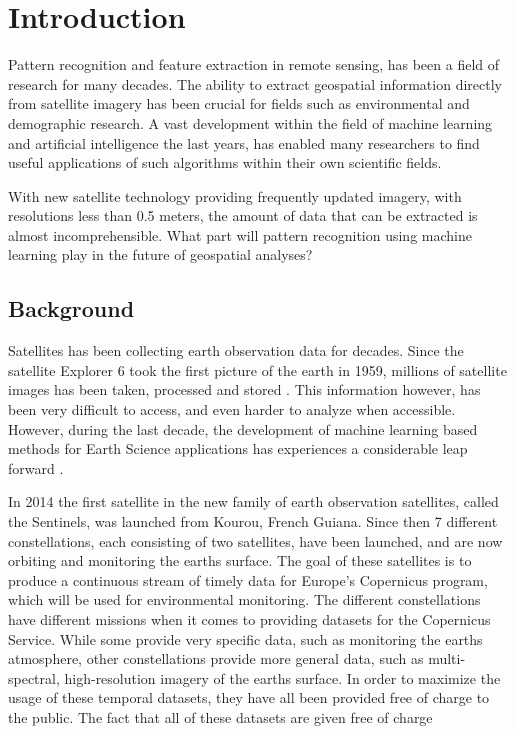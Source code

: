\chapter{Introduction}
Pattern recognition and feature extraction in remote sensing, has been a field of research for many decades. The ability to extract geospatial information directly from satellite imagery has been crucial for fields such as environmental and demographic research. A vast development within the field of machine learning and artificial intelligence the last years, has enabled many researchers to find useful applications of such algorithms within their own scientific fields.

With new satellite technology providing frequently updated imagery, with resolutions less than 0.5 meters, the amount of data that can be extracted is almost incomprehensible. What part will pattern recognition using machine learning play in the future of geospatial analyses? 

\section{Background}

Satellites has been collecting earth observation data for decades. Since the satellite Explorer 6 took the first picture of the earth in 1959, millions of satellite images has been taken, processed and stored \cite{Esa2009a}. This information however, has been very difficult to access, and even harder to analyze when accessible. However, during the last decade, the development of machine learning based methods for Earth Science applications has experiences a considerable leap forward \cite{Lary2010}.

In 2014 the first satellite in the new family of earth observation satellites, called the Sentinels, was launched from Kourou, French Guiana. Since then 7 different constellations, each consisting of two satellites,  have been launched, and are now orbiting and monitoring the earths surface. The goal of these satellites is to produce a continuous stream of timely data for Europe's Copernicus program, which will be used for environmental monitoring. The different constellations have different missions when it comes to providing datasets for the Copernicus Service. While some provide very specific data, such as monitoring the earths atmosphere, other constellations provide more general data, such as multi-spectral, high-resolution imagery of the earths surface. In order to maximize the usage of these temporal datasets, they have all been provided free of charge to the public. The fact that all of these datasets are given free of charge

